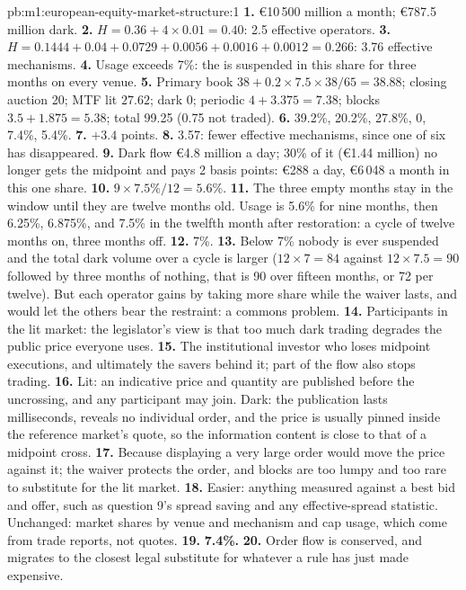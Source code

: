 \begin{solution}{pb:m1:european-equity-market-structure:1}
\textbf{1.} \euro 10\,500 million a month; \euro 787.5 million dark.
\textbf{2.} $H = 0.36 + 4\times0.01 = 0.40$: 2.5 effective operators.
\textbf{3.} $H = 0.1444 + 0.04 + 0.0729 + 0.0056 + 0.0016 + 0.0012 = 0.266$:
3.76 effective mechanisms.
\textbf{4.} Usage exceeds 7\%: the  is suspended in
this share for three months on every venue.
\textbf{5.} Primary book $38 + 0.2\times7.5\times38/65 = 38.88$; closing
auction 20; MTF lit $27.62$; dark 0; periodic $4 + 3.375 = 7.38$; blocks
$3.5 + 1.875 = 5.38$; total 99.25 (0.75 not traded).
\textbf{6.} 39.2\%, 20.2\%, 27.8\%, 0, 7.4\%, 5.4\%.
\textbf{7.} $+3.4$ points.
\textbf{8.} 3.57: fewer effective mechanisms, since one of six has
disappeared.
\textbf{9.} Dark flow \euro 4.8 million a day; 30\% of it (\euro 1.44 million)
no longer gets the midpoint and pays 2 basis points: \euro 288 a day,
\euro 6\,048 a month in this one share.
\textbf{10.} $9 \times 7.5\%/12 = 5.6\%$.
\textbf{11.} The three empty months stay in the window until they are twelve
months old. Usage is 5.6\% for nine months, then 6.25\%, 6.875\%, and 7.5\%
in the twelfth month after restoration: a cycle of twelve months on, three
months off.
\textbf{12.} 7\%.
\textbf{13.} Below 7\% nobody is ever suspended and the total dark volume
over a cycle is larger ($12\times7 = 84$ against $12\times7.5 = 90$ followed
by three months of nothing, that is 90 over fifteen months, or 72 per twelve).
But each operator gains by taking more share while the waiver lasts, and
would let the others bear the restraint: a commons problem.
\textbf{14.} Participants in the lit market: the legislator's view is that
too much dark trading degrades the public price everyone uses.
\textbf{15.} The institutional investor who loses midpoint executions, and
ultimately the savers behind it; part of the flow also stops trading.
\textbf{16.} Lit: an indicative price and quantity are published before the
uncrossing, and any participant may join. Dark: the publication lasts
milliseconds, reveals no individual order, and the price is usually pinned
inside the reference market's quote, so the information content is close to
that of a midpoint cross.
\textbf{17.} Because displaying a very large order would move the price
against it; the waiver protects the order, and blocks are too lumpy and too
rare to substitute for the lit market.
\textbf{18.} Easier: anything measured against a best bid and offer, such as
question 9's spread saving and any effective-spread statistic. Unchanged:
market shares by venue and mechanism and cap usage, which come from trade
reports, not quotes.
\textbf{19.} \textbf{7.4\%.}
\textbf{20.} Order flow is conserved, and migrates to the closest legal
substitute for whatever a rule has just made expensive.
\end{solution}

